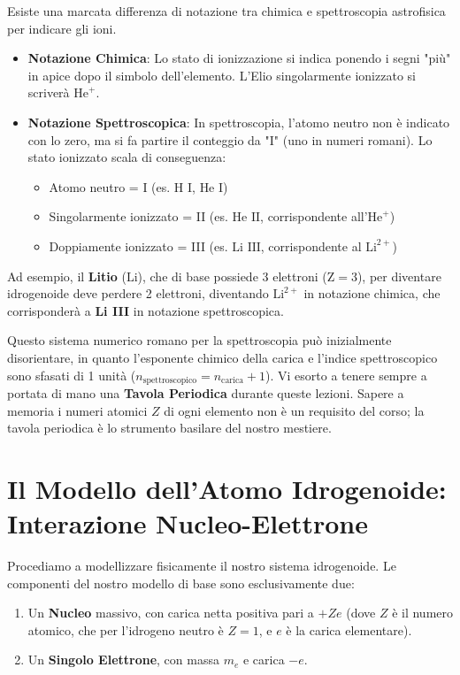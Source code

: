 Esiste una marcata differenza di notazione tra chimica e spettroscopia astrofisica per indicare gli ioni.
\begin{itemize}
\item \textbf{Notazione Chimica}: Lo stato di ionizzazione si indica ponendo i segni "più" in apice dopo il simbolo dell'elemento. L'Elio singolarmente ionizzato si scriverà $\text{He}^+$.
\item \textbf{Notazione Spettroscopica}: In spettroscopia, l'atomo neutro non è indicato con lo zero, ma si fa partire il conteggio da "I" (uno in numeri romani). Lo stato ionizzato scala di conseguenza:
\begin{itemize}
\item Atomo neutro = I (es. $\text{H I}$, $\text{He I}$)
\item Singolarmente ionizzato = II (es. $\text{He II}$, corrispondente all'$\text{He}^+$)
\item Doppiamente ionizzato = III (es. $\text{Li III}$, corrispondente al $\text{Li}^{2+}$)
\end{itemize}
\end{itemize}
Ad esempio, il \textbf{Litio} ($\text{Li}$), che di base possiede 3 elettroni ($\text{Z}=3$), per diventare idrogenoide deve perdere 2 elettroni, diventando $\text{Li}^{2+}$ in notazione chimica, che corrisponderà a \textbf{Li III} in notazione spettroscopica.

Questo sistema numerico romano per la spettroscopia può inizialmente disorientare, in quanto l'esponente chimico della carica e l'indice spettroscopico sono sfasati di 1 unità ($n_{\text{spettroscopico}} = n_{\text{carica}} + 1$). Vi esorto a tenere sempre a portata di mano una \textbf{Tavola Periodica} durante queste lezioni. Sapere a memoria i numeri atomici $Z$ di ogni elemento non è un requisito del corso; la tavola periodica è lo strumento basilare del nostro mestiere.

\section{Il Modello dell'Atomo Idrogenoide: Interazione Nucleo-Elettrone}

Procediamo a modellizzare fisicamente il nostro sistema idrogenoide.
Le componenti del nostro modello di base sono esclusivamente due:
\begin{enumerate}
\item Un \textbf{Nucleo} massivo, con carica netta positiva pari a $+Z e$ (dove $Z$ è il numero atomico, che per l'idrogeno neutro è $Z=1$, e $e$ è la carica elementare).
\item Un \textbf{Singolo Elettrone}, con massa $m_e$ e carica $-e$.
\end{enumerate}

